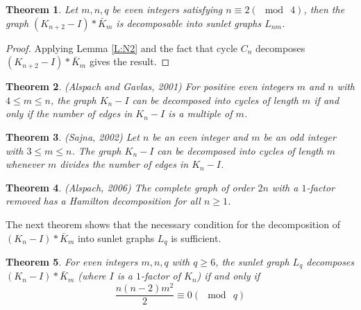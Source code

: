 \documentclass[12pt]{report}
\newtheorem{thm}{Theorem}[section]
\begin{document}
\begin{thm}
Let $m,n,q$ be even integers satisfying $n\equiv 2(\mod\ 4)$, then
the graph $(K_{n+2}-I)*\bar{K}_m$ is decomposable into sunlet graphs
$L_{nm}$.
\end{thm}
\begin{proof}
Applying Lemma \ref{L:N2} and the fact that cycle $C_n$ decomposes
$(K_{n+2}-I)*\bar{K}_m$ gives the result.
\end{proof}
\begin{thm}\label{T:AGA}(Alspach and Gavlas, 2001) %
 For positive even integers $m$ and $n$ with $4\leq m\leq n$, the
graph $K_n-I$ can be decomposed into cycles of length $m$ if and
only if the number of edges in $K_n-I$ is a multiple of $m$.
\end{thm}
\begin{thm}\label{T:SNA}(Sajna, 2002) %
 Let $n$ be an even integer and $m$ be an odd integer with $3\leq
m\leq n$. The graph $K_n-I$ can be decomposed into cycles of length
$m$ whenever $m$ divides the number of edges in $K_n-I$.
\end{thm}
\begin{thm}\label{T:ALW1}(Alspach, 2006) %
 The complete graph of order $2n$ with a $1$-factor removed has a
Hamilton decomposition for all $n\geq 1$.
\end{thm}
The next theorem shows that the necessary condition for the decomposition of $(K_n-I)*\bar{K}_m$ into sunlet graphs $L_q$ is sufficient.
\begin{thm}\label{T:NM1}
For even integers $m,n,q$ with $q\geq 6$, the sunlet graph $L_q$
decomposes $(K_n-I)*\bar{K}_m$ (where $I$ is a $1$-factor of $K_n$) if
and only if $$\frac{n(n-2)m^2}{2}\equiv 0(\mod\ q)$$
\end{thm}
\end{document}
